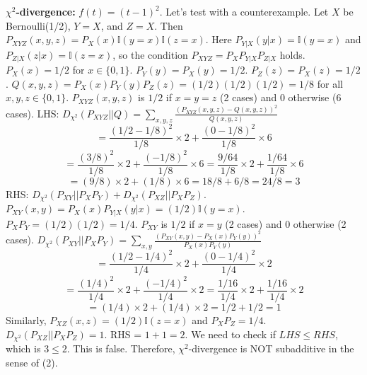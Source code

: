 \documentclass{article}
\begin{document}
\textbf{$\chi^2$-divergence:} $f(t) = (t-1)^2$.
Let's test with a counterexample. Let $X$ be Bernoulli(1/2), $Y=X$, and $Z=X$.
Then $P_{XYZ}(x,y,z) = P_X(x) \mathbb{I}(y=x) \mathbb{I}(z=x)$. Here $P_{Y|X}(y|x) = \mathbb{I}(y=x)$ and $P_{Z|X}(z|x) = \mathbb{I}(z=x)$, so the condition $P_{XYZ} = P_X P_{Y|X} P_{Z|X}$ holds.
$P_X(x) = 1/2$ for $x \in \{0, 1\}$.
$P_Y(y) = P_X(y) = 1/2$. $P_Z(z) = P_X(z) = 1/2$.
$Q(x,y,z) = P_X(x) P_Y(y) P_Z(z) = (1/2)(1/2)(1/2) = 1/8$ for all $x,y,z \in \{0,1\}$.
$P_{XYZ}(x,y,z)$ is $1/2$ if $x=y=z$ (2 cases) and 0 otherwise (6 cases).
LHS: $D_{\chi^2}(P_{XYZ} || Q) = \sum_{x,y,z} \frac{(P_{XYZ}(x,y,z) - Q(x,y,z))^2}{Q(x,y,z)}$
\[ = \frac{(1/2 - 1/8)^2}{1/8} \times 2 + \frac{(0 - 1/8)^2}{1/8} \times 6 \]
\[ = \frac{(3/8)^2}{1/8} \times 2 + \frac{(-1/8)^2}{1/8} \times 6 = \frac{9/64}{1/8} \times 2 + \frac{1/64}{1/8} \times 6 \]
\[ = (9/8) \times 2 + (1/8) \times 6 = 18/8 + 6/8 = 24/8 = 3 \]
RHS: $D_{\chi^2}(P_{XY} || P_X P_Y) + D_{\chi^2}(P_{XZ} || P_X P_Z)$.
$P_{XY}(x,y) = P_X(x) P_{Y|X}(y|x) = (1/2) \mathbb{I}(y=x)$. $P_X P_Y = (1/2)(1/2) = 1/4$.
$P_{XY}$ is $1/2$ if $x=y$ (2 cases) and 0 otherwise (2 cases).
$D_{\chi^2}(P_{XY} || P_X P_Y) = \sum_{x,y} \frac{(P_{XY}(x,y) - P_X(x)P_Y(y))^2}{P_X(x)P_Y(y)}$
\[ = \frac{(1/2 - 1/4)^2}{1/4} \times 2 + \frac{(0 - 1/4)^2}{1/4} \times 2 \]
\[ = \frac{(1/4)^2}{1/4} \times 2 + \frac{(-1/4)^2}{1/4} \times 2 = \frac{1/16}{1/4} \times 2 + \frac{1/16}{1/4} \times 2 \]
\[ = (1/4) \times 2 + (1/4) \times 2 = 1/2 + 1/2 = 1 \]
Similarly, $P_{XZ}(x,z) = (1/2) \mathbb{I}(z=x)$ and $P_X P_Z = 1/4$.
$D_{\chi^2}(P_{XZ} || P_X P_Z) = 1$.
RHS = $1 + 1 = 2$.
We need to check if $LHS \le RHS$, which is $3 \le 2$. This is false.
Therefore, $\chi^2$-divergence is NOT subadditive in the sense of (2).
\end{document}
